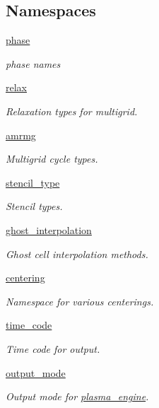 \subsection*{Namespaces}
\begin{DoxyCompactItemize}
\item 
 \hyperlink{namespacephase}{phase}
\begin{DoxyCompactList}\small\item\em phase names \end{DoxyCompactList}\item 
 \hyperlink{namespacerelax}{relax}
\begin{DoxyCompactList}\small\item\em Relaxation types for multigrid. \end{DoxyCompactList}\item 
 \hyperlink{namespaceamrmg}{amrmg}
\begin{DoxyCompactList}\small\item\em Multigrid cycle types. \end{DoxyCompactList}\item 
 \hyperlink{namespacestencil__type}{stencil\+\_\+type}
\begin{DoxyCompactList}\small\item\em Stencil types. \end{DoxyCompactList}\item 
 \hyperlink{namespaceghost__interpolation}{ghost\+\_\+interpolation}
\begin{DoxyCompactList}\small\item\em Ghost cell interpolation methods. \end{DoxyCompactList}\item 
 \hyperlink{namespacecentering}{centering}
\begin{DoxyCompactList}\small\item\em Namespace for various centerings. \end{DoxyCompactList}\item 
 \hyperlink{namespacetime__code}{time\+\_\+code}
\begin{DoxyCompactList}\small\item\em Time code for output. \end{DoxyCompactList}\item 
 \hyperlink{namespaceoutput__mode}{output\+\_\+mode}
\begin{DoxyCompactList}\small\item\em Output mode for \hyperlink{classplasma__engine}{plasma\+\_\+engine}. \end{DoxyCompactList}\item 

\end{DoxyCompactItemize}
